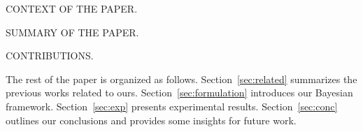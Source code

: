 CONTEXT OF THE PAPER.

SUMMARY OF THE PAPER.

CONTRIBUTIONS.

The rest of the paper is organized as follows. Section~\ref{sec:related}
summarizes the previous works related to ours. Section~\ref{sec:formulation}
introduces our Bayesian framework. Section~\ref{sec:exp} presents experimental
results. Section~\ref{sec:conc} outlines our conclusions and provides some
insights for future work.
